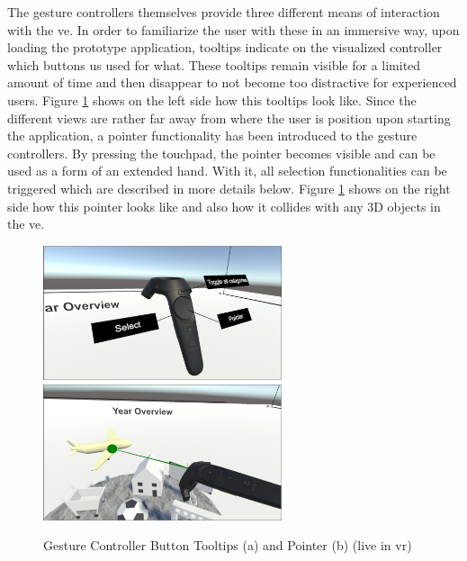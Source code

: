 The gesture controllers themselves provide three different means of interaction with the \gls{ve}. In order to familiarize the user with these in an immersive way, upon loading the prototype application, tooltips indicate on the visualized controller which buttons us used for what. These tooltips remain visible for a limited amount of time and then disappear to not become too distractive for experienced users. Figure \ref{fig:unitypointertooltips} shows on the left side how this tooltips look like. \newline
Since the different views are rather far away from where the user is position upon starting the application, a pointer functionality has been introduced to the gesture controllers. By pressing the touchpad, the pointer becomes visible and can be used as a form of an extended hand. With it, all selection functionalities can be triggered which are described in more details below. Figure \ref{fig:unitypointertooltips} shows on the right side how this pointer looks like and also how it collides with any 3D objects in the \gls{ve}.
\begin{figure}[t]
	\begin{center}
		\includegraphics[width=7cm]{03_Figures/08_Development/Controller_Tooltips.png}
		\includegraphics[width=7cm]{03_Figures/08_Development/Controller_Pointer.png}
		\caption[Gesture Controller Button Tooltips and Pointer (live in \gls{vr})]{Gesture Controller Button Tooltips (a) and Pointer (b) (live in \gls{vr})}
		\label{fig:unitypointertooltips}
	\end{center}
\end{figure}

